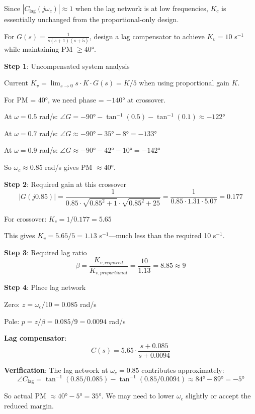 Since $|C_{\text{lag}}(j\omega_c)| \approx 1$ when the lag network is at low frequencies, $K_c$ is essentially unchanged from the proportional-only design.

\begin{example}
\label{ex:lag_design}
For $G(s) = \frac{1}{s(s+1)(s+5)}$, design a lag compensator to achieve $K_v = 10$ s$^{-1}$ while maintaining PM $\geq 40°$.

\textbf{Step 1}: Uncompensated system analysis

Current $K_v = \lim_{s \to 0} s \cdot K \cdot G(s) = K/5$ when using proportional gain $K$.

For PM = 40°, we need phase = $-140°$ at crossover.

At $\omega = 0.5$ rad/s: $\angle G = -90° - \tan^{-1}(0.5) - \tan^{-1}(0.1) \approx -122°$

At $\omega = 0.7$ rad/s: $\angle G \approx -90° - 35° - 8° = -133°$

At $\omega = 0.9$ rad/s: $\angle G \approx -90° - 42° - 10° = -142°$

So $\omega_c \approx 0.85$ rad/s gives PM $\approx 40°$.

\textbf{Step 2}: Required gain at this crossover
\begin{equation}
|G(j0.85)| = \frac{1}{0.85 \cdot \sqrt{0.85^2 + 1} \cdot \sqrt{0.85^2 + 25}} = \frac{1}{0.85 \cdot 1.31 \cdot 5.07} = 0.177
\end{equation}

For crossover: $K_c = 1/0.177 = 5.65$

This gives $K_v = 5.65/5 = 1.13$ s$^{-1}$---much less than the required 10 s$^{-1}$.

\textbf{Step 3}: Required lag ratio
\begin{equation}
\beta = \frac{K_{v,required}}{K_{v,proportional}} = \frac{10}{1.13} = 8.85 \approx 9
\end{equation}

\textbf{Step 4}: Place lag network

Zero: $z = \omega_c/10 = 0.085$ rad/s

Pole: $p = z/\beta = 0.085/9 = 0.0094$ rad/s

\textbf{Lag compensator}:
\begin{equation}
C(s) = 5.65 \cdot \frac{s + 0.085}{s + 0.0094}
\end{equation}

\textbf{Verification}: The lag network at $\omega_c = 0.85$ contributes approximately:
\begin{equation}
\angle C_{\text{lag}} = \tan^{-1}(0.85/0.085) - \tan^{-1}(0.85/0.0094) \approx 84° - 89° = -5°
\end{equation}

So actual PM $\approx 40° - 5° = 35°$. We may need to lower $\omega_c$ slightly or accept the reduced margin.
\end{example}

